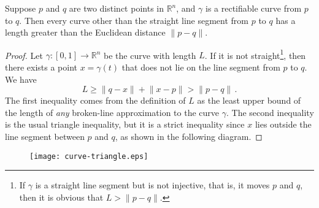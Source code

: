 \documentclass[12pt]{article}
\newcommand{\real}{\mathbb{R}}
\providecommand{\norm}[1]{\lVert#1\rVert}
\begin{document}

Suppose $p$ and $q$ are two distinct points in $\real^n$, 
and $\gamma$ is a rectifiable curve from $p$ to $q$.
Then every curve other than the straight line segment from $p$ to $q$
has a length greater than the Euclidean distance $\norm{p -q}$.

\begin{proof}
Let $\gamma\colon [0,1] \to  \real^n$
be the curve with length $L$.
If it is not straight\footnote{If $\gamma$ is a straight line segment but is not injective, that is, it moves  $p$ and $q$, then it is obvious that $L > \norm{p-q}$.}, then there exists a point $x = \gamma(t)$ that does not lie on the line segment from $p$ to $q$.
We have
\[
L \geq \norm{q - x} + \norm{x - p} > \norm{p -q }\,.
\]
The first inequality comes from the definition of $L$ as the least upper bound of the length of \emph{any} broken-line approximation to the curve $\gamma$.
The second inequality is the usual triangle inequality,
but it is a strict inequality since $x$ lies outside the line segment between $p$ and $q$,
as shown in the following diagram.
\end{proof}

\begin{figure}
\texttt{[image: curve-triangle.eps]}
\end{figure}

\end{document}

